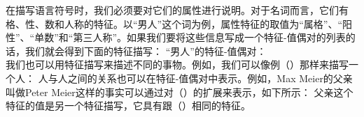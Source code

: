 在描写语言符号时，我们必须要对它们的属性进行说明。对于名词而言，它们有格、性、数和人称的特征。以“男人”这个词为例，属性特征的取值为“属格”、“阳性”、“单数”和“第三人称”。如果我们要将这些信息写成一个特征-值偶对的列表的话，我们就会得到下面的特征描写：
\eas
“男人”的特征-值偶对：\\
\zs
我们也可以用特征描写来描述不同的事物。例如，我们可以像例（）那样来描写一个人：
\ea
{}
\z
人与人之间的关系也可以在特征-值偶对中表示。例如，Max Meier的父亲叫做Peter Meier这样的事实可以通过对（）的扩展来表示，如下所示：
\ea
{}
\z
\textsc{父亲}这个特征的值是另一个特征描写，它具有跟（）相同的特征。

